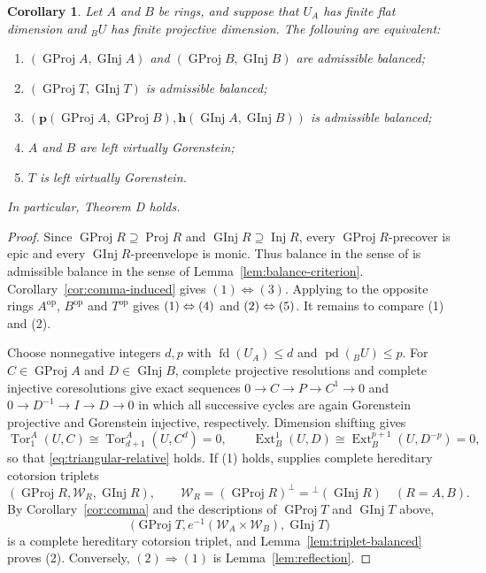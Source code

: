 \documentclass[11pt]{amsart}
\newtheorem{corollary}[theorem]{Corollary}
\theoremstyle{definition}
\theoremstyle{remark}
\theoremstyle{plain}
\numberwithin{equation}{section}
\begin{document}
\begin{corollary}\label{cor:virtually-gorenstein}
Let $A$ and $B$ be rings, and suppose that $U_A$ has finite flat
dimension and ${}_BU$ has finite projective dimension. The following are
equivalent:
\begin{enumerate}
 \item $(\operatorname{GProj} A, \operatorname{GInj} A)$ and $(\operatorname{GProj} B, \operatorname{GInj} B)$ are admissible
 balanced;
 \item $(\operatorname{GProj} T, \operatorname{GInj} T)$ is admissible balanced;
 \item $(\mathbf p(\operatorname{GProj} A, \operatorname{GProj} B), \mathbf h(\operatorname{GInj} A, \operatorname{GInj} B))$ is
 admissible balanced;
 \item $A$ and $B$ are left virtually Gorenstein;
 \item $T$ is left virtually Gorenstein.
\end{enumerate}
In particular, Theorem D holds.
\end{corollary}

\begin{proof}
Since $\operatorname{GProj} R\supseteq\operatorname{Proj} R$ and $\operatorname{GInj} R\supseteq\operatorname{Inj} R$, every
$\operatorname{GProj} R$-precover is epic and every $\operatorname{GInj} R$-preenvelope is monic.
Thus balance in the sense of \cite[Definition~3.1]{EHT} is admissible
balance in the sense of Lemma~\ref{lem:balance-criterion}.
Corollary~\ref{cor:comma-induced} gives
$(1) \Leftrightarrow (3)$.  Applying \cite[Corollary~3.11]{EHT} to the opposite rings $A^{\mathrm{op}}$, $B^{\mathrm{op}}$ and $T^{\mathrm{op}}$ gives $\textup{(1)}\Leftrightarrow\textup{(4)}$ and
$\textup{(2)}\Leftrightarrow\textup{(5)}$. It remains to compare \textup{(1)} and \textup{(2)}.

Choose nonnegative integers $d, p$ with $\operatorname{fd}(U_A) \leq d$ and
$\operatorname{pd}({}_BU) \leq p$. For $C \in \operatorname{GProj} A$ and $D \in \operatorname{GInj} B$,
complete projective resolutions and complete injective coresolutions
give exact sequences $0 \to C \to P \to C^1 \to 0$ and
$0 \to D^{-1} \to I \to D \to 0$ in which all successive cycles are again
Gorenstein projective and Gorenstein injective, respectively. Dimension
shifting gives
\[
 \operatorname{Tor}^A_1(U, C) \cong \operatorname{Tor}^A_{d+1}(U, C^d) = 0, \qquad
 \operatorname{Ext}^1_B(U, D) \cong \operatorname{Ext}^{p+1}_B(U, D^{-p}) = 0,
\]
so that \eqref{eq:triangular-relative} holds. If (1) holds,
\cite[Corollary~3.11]{EHT} supplies complete hereditary cotorsion
triplets
\[
 (\operatorname{GProj} R, \mathcal{W}_R, \operatorname{GInj} R), \qquad
 \mathcal{W}_R = (\operatorname{GProj} R)^\perp = {}^\perp(\operatorname{GInj} R)
 \quad(R = A, B).
\]
By Corollary~\ref{cor:comma} and the descriptions of $\operatorname{GProj} T$ and $\operatorname{GInj} T$ above,
\[
 \bigl(\operatorname{GProj} T, e^{-1}(\mathcal{W}_A \times \mathcal{W}_B), \operatorname{GInj} T\bigr)
\]
is a complete hereditary cotorsion triplet, and
Lemma~\ref{lem:triplet-balanced} proves (2). Conversely,
$(2) \Rightarrow (1)$ is Lemma~\ref{lem:reflection}.
\end{proof}
\end{document}
